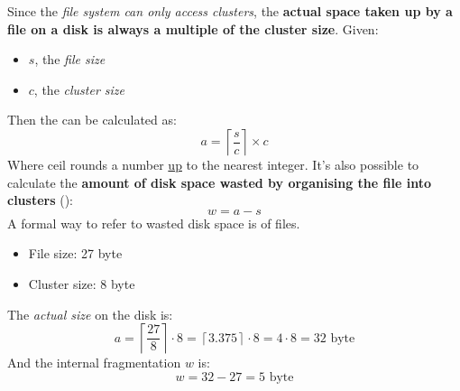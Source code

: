 \begin{itemize}
    Since the \emph{file system can only access clusters}, the \textbf{actual space taken up by a file on a disk is always a multiple of the cluster size}. Given:
    \begin{itemize}
        \item $s$, the \emph{file size}
        \item $c$, the \emph{cluster size}
    \end{itemize}
    Then the  can be calculated as:
    \begin{equation}
        a = \left\lceil \dfrac{s}{c} \right\rceil \times c
    \end{equation}
    Where $\mathrm{ceil}$ rounds a number \underline{up} to the nearest integer. It's also possible to calculate the \textbf{amount of disk space wasted by organising the file into clusters} ():
    \begin{equation}
        w = a - s
    \end{equation}
    A formal way to refer to wasted disk space is  of files.
    \begin{examplebox}
        \begin{itemize}
            \item File size: 27 byte
            \item Cluster size: 8 byte
        \end{itemize}
        The \emph{actual size} on the disk is:
        \begin{equation*}
            a = \left\lceil \dfrac{27}{8} \right\rceil \cdot 8 = \left\lceil 3.375 \right\rceil \cdot 8 = 4 \cdot 8 = 32 \text{ byte}
        \end{equation*}
        And the internal fragmentation $w$ is:
        \begin{equation*}
            w = 32 - 27 = 5 \text{ byte}
        \end{equation*}
    \end{examplebox}


\end{itemize}
